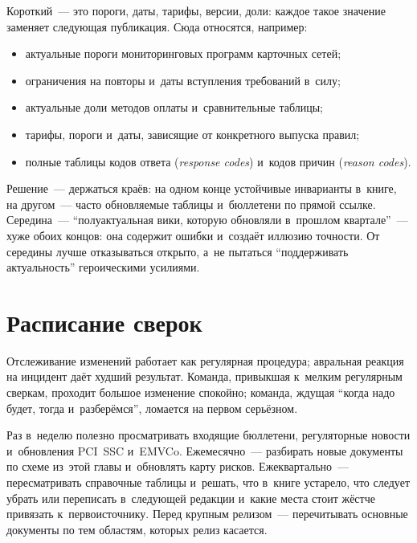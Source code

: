 Короткий~--- это пороги, даты, тарифы, версии, доли: каждое такое значение
заменяет следующая публикация. Сюда относятся, например:

\begin{itemize}
  \item актуальные пороги мониторинговых программ карточных сетей;
  \item ограничения на повторы и~даты вступления требований в~силу;
  \item актуальные доли методов оплаты и~сравнительные таблицы;
  \item тарифы, пороги и~даты, зависящие от конкретного выпуска правил;
  \item полные таблицы кодов ответа (\textit{response codes}) и~кодов причин
    (\textit{reason codes}).
\end{itemize}

Решение~--- держаться краёв: на одном конце устойчивые инварианты в~книге,
на другом~--- часто обновляемые таблицы и~бюллетени по прямой ссылке. Середина~--- \enquote{полуактуальная вики, которую обновляли
в~прошлом квартале}~--- хуже обоих концов: она содержит ошибки и~создаёт
иллюзию точности. От середины лучше отказываться открыто, а~не пытаться
\enquote{поддерживать актуальность} героическими усилиями.

\section*{Расписание сверок}\label{sec:ps-tracking-schedule}

Отслеживание изменений работает как регулярная процедура; авральная реакция на инцидент даёт
худший результат. Команда, привыкшая к~мелким регулярным сверкам, проходит
большое изменение спокойно; команда, ждущая \enquote{когда надо будет, тогда
и~разберёмся}, ломается на первом серьёзном.

Раз в~неделю полезно просматривать входящие бюллетени, регуляторные новости
и~обновления PCI~SSC и~EMVCo. Ежемесячно~--- разбирать новые документы по схеме
из~этой главы и~обновлять карту рисков. Ежеквартально~--- пересматривать
справочные таблицы и~решать, что в~книге устарело, что следует убрать или
переписать в~следующей редакции и~какие места стоит жёстче привязать
к~первоисточнику. Перед крупным релизом~--- перечитывать основные документы по
тем областям, которых релиз касается.
